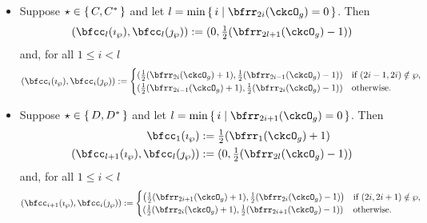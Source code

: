 \documentclass[12pt,a4paper]{amsart}
\numberwithin{equation}{section}
\theoremstyle{remark}
\def\half{{\tfrac{1}{2}}}
\def\imathp{\imath_{\sP}}
\def\jmathp{\jmath_{\sP}}
\def\sP{\wp}
\begin{document}
  \begin{itemize}
    \item Suppose $\star\in \set{C,C^{*}}$ and let
    $l=\min\set{i| \bfrr_{2i}(\ckcO_{g})=0}$.
    Then
    \[
      (\bfcc_{l}(\imathp), \bfcc_{l}(\jmathp)) :=
      (0,\half(\bfrr_{2l+1}(\ckcO_{g})-1))
    \]
    and, for all $1\leq i< l$
    \[
      (\bfcc_{i}(\imathp), \bfcc_{i}(\jmathp)):=
      \begin{cases}
        (\half (\bfrr_{2i}(\ckcO_{g})+1),
        \half (\bfrr_{2i-1}(\ckcO_{g})-1))
        & \text{if } (2i-1,2i)\notin \sP,\\
        (\half (\bfrr_{2i-1}(\ckcO_{g})+1),\half (\bfrr_{2i}(\ckcO_{g})-1)) & \text{otherwise.}
      \end{cases}
    \]
    \item Suppose $\star\in \set{D,D^{*}}$ and let
    $l=\min\set{i| \bfrr_{2i+1}(\ckcO_{g})=0}$.
    Then
    \[
      \begin{split}
        \bfcc_{1}(\imathp) &:=
        \half(\bfrr_{1}(\ckcO_{g})+1)\\
        (\bfcc_{l+1}(\imathp), \bfcc_{l}(\jmathp)) &:= (0,\half(\bfrr_{2l}(\ckcO_{g})-1))
      \end{split}
    \]
    and, for all $1\leq i<l$
    \[
      (\bfcc_{i+1}(\imathp), \bfcc_{i}(\jmathp)):=
      \begin{cases}
        \left(\half (\bfrr_{2i+1}(\ckcO_{g})+1),
        \half (\bfrr_{2i}(\ckcO_{g})-1)\right)
        & \text{if } (2i,2i+1)\notin \sP,\\
        (\half (\bfrr_{2i}(\ckcO_{g})+1),\half (\bfrr_{2i+1}(\ckcO_{g})-1)) & \text{otherwise.}
      \end{cases}
    \]


\end{itemize}
\end{document}
